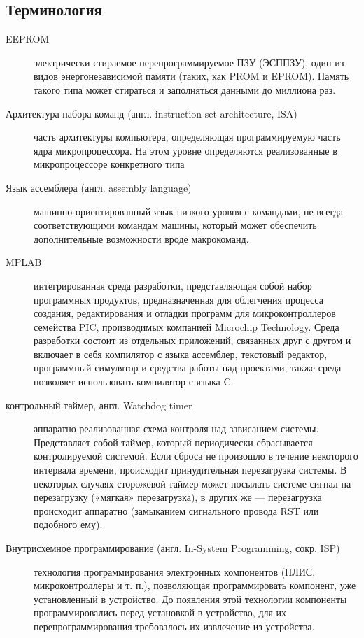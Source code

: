 \subsection{Терминология}
\begin{description}

\item[EEPROM]  
электрически стираемое перепрограммируемое ПЗУ (ЭСППЗУ), один из видов энергонезависимой памяти (таких, как PROM и EPROM). Память такого типа может стираться и заполняться данными до миллиона раз.

\item[Архитектура набора команд (англ. instruction set architecture, ISA)]
часть архитектуры компьютера, определяющая программируемую часть ядра микропроцессора. На этом уровне определяются реализованные в микропроцессоре конкретного типа

\item[Язык ассемблера (англ. assembly language)]
машинно-ориентированный язык низкого уровня с командами, не всегда соответствующими командам машины, который может обеспечить дополнительные возможности вроде макрокоманд.

\item[MPLAB]
интегрированная среда разработки, представляющая собой набор программных продуктов, предназначенная для облегчения процесса создания, редактирования и отладки программ для микроконтроллеров семейства PIC, производимых компанией Microchip Technology. Среда разработки состоит из отдельных приложений, связанных друг с другом и включает в себя компилятор с языка ассемблер, текстовый редактор, программный симулятор и средства работы над проектами, также среда позволяет использовать компилятор с языка C.

\item[контрольный таймер, англ. Watchdog timer]
аппаратно реализованная схема контроля над зависанием системы. Представляет собой таймер, который периодически сбрасывается контролируемой системой. Если сброса не произошло в течение некоторого интервала времени, происходит принудительная перезагрузка системы. В некоторых случаях сторожевой таймер может посылать системе сигнал на перезагрузку («мягкая» перезагрузка), в других же — перезагрузка происходит аппаратно (замыканием сигнального провода RST или подобного ему).

\item[Внутрисхемное программирование (англ. In-System Programming, сокр. ISP)]
технология программирования электронных компонентов (ПЛИС, микроконтроллеры и т. п.), позволяющая программировать компонент, уже установленный в устройство. До появления этой технологии компоненты программировались перед установкой в устройство, для их перепрограммирования требовалось их извлечение из устройства.
 

\end{description}
